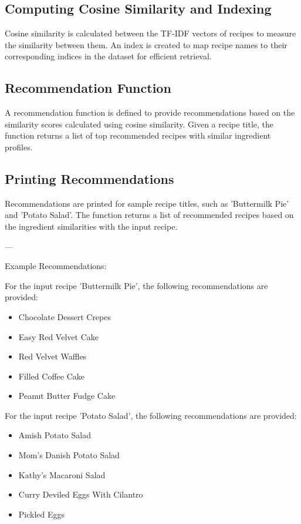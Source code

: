 \documentclass[conference]{IEEEtran}
\begin{document}
\subsection{Computing Cosine Similarity and Indexing}

Cosine similarity is calculated between the TF-IDF vectors of recipes to measure the similarity between them. An index is created to map recipe names to their corresponding indices in the dataset for efficient retrieval.

\subsection{Recommendation Function}

A recommendation function is defined to provide recommendations based on the similarity scores calculated using cosine similarity. Given a recipe title, the function returns a list of top recommended recipes with similar ingredient profiles.

\subsection{Printing Recommendations}

Recommendations are printed for sample recipe titles, such as 'Buttermilk Pie' and 'Potato Salad'. The function returns a list of recommended recipes based on the ingredient similarities with the input recipe.

---

Example Recommendations:

For the input recipe 'Buttermilk Pie', the following recommendations are provided:
\begin{itemize}
    \item Chocolate Dessert Crepes
    \item Easy Red Velvet Cake
    \item Red Velvet Waffles
    \item Filled Coffee Cake
    \item Peanut Butter Fudge Cake
\end{itemize}

For the input recipe 'Potato Salad', the following recommendations are provided:
\begin{itemize}
    \item Amish Potato Salad
    \item Mom's Danish Potato Salad
    \item Kathy's Macaroni Salad
    \item Curry Deviled Eggs With Cilantro
    \item Pickled Eggs
\end{itemize}
\end{document}
